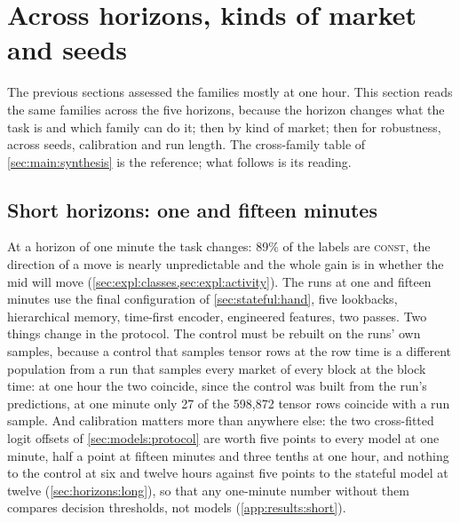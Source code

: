 \section{Across horizons, kinds of market and seeds}
\label{ch:horizons}

The previous sections assessed the families mostly at one hour.  This section reads the
same families across the five horizons, because the horizon changes what the task is and
which family can do it; then by kind of market; then for robustness, across seeds,
calibration and run length.  The cross-family table of \cref{sec:main:synthesis} is the
reference; what follows is its reading.

\subsection{Short horizons: one and fifteen minutes}
\label{sec:horizons:short}
\label{sec:exp:short}

At a horizon of one minute the task changes: 89\% of the labels are \textsc{const}, the
direction of a move is nearly unpredictable and the whole gain is in whether the mid will
move (\cref{sec:expl:classes,sec:expl:activity}).  The runs at one and fifteen minutes use
the final configuration of \cref{sec:stateful:hand}, five lookbacks, hierarchical memory,
time-first encoder, engineered features, two passes.  Two things change in the protocol.
The control must be rebuilt on the runs' own samples, because a control that samples
tensor rows at the row time is a different population from a run that samples every market
of every block at the block time: at one hour the two coincide, since the control was built
from the run's predictions, at one minute only 27 of the 598{,}872 tensor rows coincide with
a run sample.  And calibration matters more than anywhere else: the two cross-fitted logit
offsets of \cref{sec:models:protocol} are worth five points to every model at one minute,
half a point at fifteen minutes and three tenths at one hour, and nothing to the control
at six and twelve hours against five points to the stateful model at twelve
(\cref{sec:horizons:long}), so that any one-minute number without them compares decision
thresholds, not models (\cref{app:results:short}).

